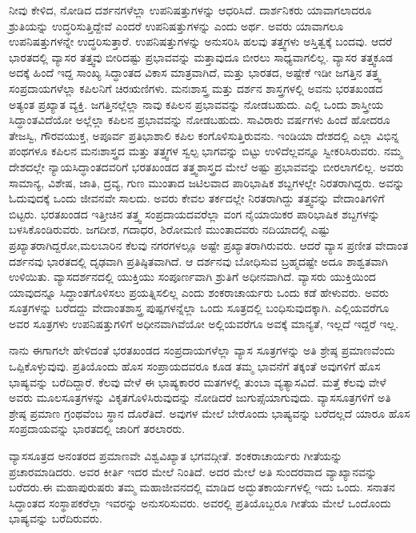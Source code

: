 ನೀವು ಕೇಳಿದ, ನೋಡಿದ ದರ್ಶನಗಳೆಲ್ಲಾ ಉಪನಿಷತ್ತುಗಳನ್ನು ಆಧರಿಸಿದೆ. ದಾರ್ಶನಿಕರು ಯಾವಾಗಲಾದರೂ ಶ್ರುತಿಯನ್ನು ಉದ್ಧರಿಸುತ್ತಿದ್ದೇವೆ ಎಂದರೆ ಉಪನಿಷತ್ತುಗಳನ್ನು ಎಂದು ಅರ್ಥ. ಅವರು ಯಾವಾಗಲೂ ಉಪನಿಷತ್ತು\-ಗಳನ್ನೇ ಉದ್ಧರಿಸುತ್ತಾರೆ. ಉಪನಿಷತ್ತುಗಳನ್ನು ಅನುಸರಿಸಿ ಹಲವು ತತ್ತ್ವಗಳು ಅಸ್ತಿತ್ವಕ್ಕೆ ಬಂದವು. ಆದರೆ ಭಾರತದಲ್ಲಿ ವ್ಯಾಸರ ತತ್ತ್ವವು ಬೀರಿದಷ್ಟು ಪ್ರಭಾವವನ್ನು ಮತ್ತಾವುದೂ ಬೀರಲು ಸಾಧ್ಯವಾಗಲಿಲ್ಲ. ವ್ಯಾಸರ ತತ್ತ್ವಕೂಡ ಅದಕ್ಕೆ ಹಿಂದೆ ಇದ್ದ ಸಾಂಖ್ಯ ಸಿದ್ಧಾಂತದ ವಿಕಾಸ ಮಾತ್ರವಾಗಿದೆ, ಮತ್ತು ಭಾರತದ, ಅಷ್ಟೇಕೆ ಇಡೀ ಜಗತ್ತಿನ ತತ್ತ್ವ ಸಂಪ್ರದಾಯಗಳೆಲ್ಲಾ ಕಪಿಲನಿಗೆ ಚಿರಋಣಿಗಳು. ಮನಃಶಾಸ್ತ್ರ ಮತ್ತು ದರ್ಶನ ಶಾಸ್ತ್ರಗಳಲ್ಲಿ ಅವನು ಭರತಖಂಡದ ಅತ್ಯಂತ ಪ್ರಖ್ಯಾತ ವ್ಯಕ್ತಿ. ಜಗತ್ತಿನಲ್ಲೆಲ್ಲಾ ನಾವು ಕಪಿಲನ ಪ್ರಭಾವವನ್ನು ನೋಡಬಹುದು. ಎಲ್ಲಿ ಒಂದು ಶಾಸ್ತ್ರೀಯ ಸಿದ್ಧಾಂತವಿದೆಯೋ ಅಲ್ಲೆಲ್ಲಾ ಕಪಿಲನ ಪ್ರಭಾವವನ್ನು ನೋಡಬಹುದು. ಸಾವಿರಾರು ವರ್ಷಗಳು ಹಿಂದೆ ಹೋದರೂ ತೇಜಸ್ವಿ, ಗೌರವಯುಕ್ತ, ಅಪೂರ್ವ ಪ್ರತಿಭಾಶಾಲಿ ಕಪಿಲ ಕಂಗೊಳಿಸುತ್ತಿರುವನು. ಇಂಡಿಯಾ ದೇಶದಲ್ಲಿ ಎಲ್ಲಾ ವಿಭಿನ್ನ ಪಂಥಗಳೂ ಕಪಿಲನ ಮನಃಶಾಸ್ತ್ರದ ಮತ್ತು ತತ್ತ್ವಗಳ ಸ್ವಲ್ಪ ಭಾಗವನ್ನು ಬಿಟ್ಟು ಉಳಿದೆಲ್ಲವನ್ನೂ ಸ್ವೀಕರಿ\-ಸಿರುವರು. ನಮ್ಮ ದೇಶದಲ್ಲೇ ನ್ಯಾಯಸಿದ್ಧಾಂತದವರಿಗೆ ಭರತಖಂಡದ ತತ್ತ್ವಶಾಸ್ತ್ರದ ಮೇಲೆ ಅಷ್ಟು ಪ್ರಭಾವವನ್ನು ಬೀರಲಾಗಲಿಲ್ಲ. ಅವರು ಸಾಮಾನ್ಯ, ವಿಶೇಷ, ಜಾತಿ, ದ್ರವ್ಯ, ಗುಣ ಮುಂತಾದ ಜಟಿಲವಾದ ಪಾರಿಭಾಷಿಕ ಶಬ್ದಗಳಲ್ಲೇ ನಿರತರಾಗಿದ್ದರು. ಅವನ್ನು ಓದುವುದಕ್ಕೆ ಒಂದು ಜೀವನವೇ ಸಾಲದು. ಅವರು ಕೇವಲ ತರ್ಕದಲ್ಲೇ ನಿರತರಾಗಿದ್ದು ತತ್ತ್ವವನ್ನು ವೇದಾಂತಿಗಳಿಗೆ ಬಿಟ್ಟರು. ಭರತಖಂಡದ ಇತ್ತೀಚಿನ ತತ್ತ್ವ ಸಂಪ್ರದಾಯದವರೆಲ್ಲಾ ವಂಗ ನೈಯಾಯಿಕರ ಪಾರಿಭಾಷಿಕ ಶಬ್ದಗಳನ್ನು ಬಳಸಿಕೊಂಡಿರುವರು. ಜಗದೀಶ, ಗದಾಧರ, ಶಿರೋಮಣಿ ಮುಂತಾದವರು ನದಿಯಾದಲ್ಲಿ ಎಷ್ಟು ಪ್ರಖ್ಯಾತರಾಗಿದ್ದರೋ,\break ಮಲಬಾರಿನ ಕೆಲವು ನಗರಗಳಲ್ಲೂ ಅಷ್ಟೇ ಪ್ರಖ್ಯಾತರಾಗಿರುವರು. ಆದರೆ ವ್ಯಾಸ ಪ್ರಣೀತ ವೇದಾಂತ ದರ್ಶನವು ಭಾರತದಲ್ಲಿ ದೃಢವಾಗಿ ಪ್ರತಿಷ್ಠಿತವಾಗಿದೆ. ಆ ದರ್ಶನವು ಬೋಧಿಸುವ ಬ್ರಹ್ಮದಷ್ಟೇ ಅದೂ ಶಾಶ್ವತವಾಗಿ ಉಳಿಯಿತು. ವ್ಯಾಸದರ್ಶನದಲ್ಲಿ ಯುಕ್ತಿಯು ಸಂಪೂರ್ಣವಾಗಿ ಶ್ರುತಿಗೆ ಅಧೀನವಾಗಿದೆ. ವ್ಯಾಸರು ಯುಕ್ತಿಯಿಂದ ಯಾವುದನ್ನೂ ಸಿದ್ಧಾಂತಗೊಳಿಸಲು ಪ್ರಯತ್ನಿಸಲಿಲ್ಲ ಎಂದು ಶಂಕರಾಚಾರ್ಯರು ಒಂದು ಕಡೆ ಹೇಳುವರು. ಅವರು ಸೂತ್ರಗಳನ್ನು ಬರೆದದ್ದು ವೇದಾಂತಶಾಸ್ತ್ರ ಪುಷ್ಪಗಳನ್ನೆಲ್ಲಾ ಒಂದು ಸೂತ್ರದಲ್ಲಿ ಬಂಧಿಸುವುದಕ್ಕಾಗಿ. ಎಲ್ಲಿಯವರೆಗೂ ಅವರ ಸೂತ್ರಗಳು ಉಪನಿಷತ್ತುಗಳಿಗೆ ಅಧೀನವಾಗಿವೆಯೋ ಅಲ್ಲಿಯವರೆಗೂ ಅವಕ್ಕೆ ಮಾನ್ಯತೆ, ಇಲ್ಲದೆ ಇದ್ದರೆ ಇಲ್ಲ.

\vskip 2pt

ನಾನು ಈಗಾಗಲೇ ಹೇಳಿದಂತೆ ಭರತಖಂಡದ ಸಂಪ್ರದಾಯಗಳೆಲ್ಲಾ ವ್ಯಾಸ ಸೂತ್ರಗಳನ್ನು ಅತಿ ಶ್ರೇಷ್ಠ ಪ್ರಮಾಣವೆಂದು ಒಪ್ಪಿಕೊಳ್ಳುವುವು. ಪ್ರತಿಯೊಂದು ಹೊಸ ಸಂಪ್ರಾಯದವರೂ ಕೂಡ ತಮ್ಮ ಭಾವನೆಗೆ ತಕ್ಕಂತೆ ಅವುಗಳಿಗೆ ಹೊಸ ಭಾಷ್ಯವನ್ನು ಬರೆದಿದ್ದಾರೆ. ಕೆಲವು ವೇಳೆ ಈ ಭಾಷ್ಯಕಾರರ ಮತಗಳಲ್ಲಿ ತುಂಬಾ ವ್ಯತ್ಯಾಸವಿದೆ. ಮತ್ತೆ ಕೆಲವು ವೇಳೆ ಅವರು ಮೂಲಸೂತ್ರಗಳನ್ನು ವಿಕೃತಗೊಳಿಸಿರುವುದನ್ನು ನೋಡಿದರೆ ಜುಗುಪ್ಸೆಯಾಗುವುದು. ವ್ಯಾಸಸೂತ್ರಗಳಿಗೆ ಅತಿ ಶ್ರೇಷ್ಠ ಪ್ರಮಾಣ ಗ್ರಂಥವೆಂಬ ಸ್ಥಾನ ದೊರೆತಿದೆ. ಅವುಗಳ ಮೇಲೆ ಬೇರೊಂದು ಭಾಷ್ಯವನ್ನು ಬರೆದಲ್ಲದೆ ಯಾರೂ ಹೊಸ ಸಂಪ್ರದಾಯವನ್ನು ಭಾರತದಲ್ಲಿ ಜಾರಿಗೆ ತರಲಾರರು.

\vskip 2pt

ವ್ಯಾಸಸೂತ್ರದ ಅನಂತರದ ಪ್ರಮಾಣವೇ ವಿಶ್ವವಿಖ್ಯಾತ ಭಗವದ್ಗೀತೆ. ಶಂಕರಾಚಾರ್ಯರು ಗೀತೆಯನ್ನು ಪ್ರಚಾರಮಾಡಿದರು. ಅವರ ಕೀರ್ತಿ ಇದರ ಮೇಲೆ ನಿಂತಿದೆ. ಅದರ ಮೇಲೆ ಅತಿ ಸುಂದರವಾದ ವ್ಯಾಖ್ಯಾನವನ್ನು ಬರೆದರು.\break ಈ ಮಹಾಪುರುಷರು ತಮ್ಮ ಮಹಾಜೀವನದಲ್ಲಿ ಮಾಡಿದ ಅದ್ಭುತ\break ಕಾರ್ಯಗಳಲ್ಲಿ ಇದು ಒಂದು. ಸನಾತನ ಸಿದ್ಧಾಂತದ ಸಂಸ್ಥಾಪಕರೆಲ್ಲಾ ಇವರನ್ನು ಅನುಸರಿಸುವರು. ಅವರಲ್ಲಿ ಪ್ರತಿಯೊಬ್ಬರೂ ಗೀತೆಯ ಮೇಲೆ ಒಂದೊಂದು ಭಾಷ್ಯವನ್ನು ಬರೆದಿರುವರು.

